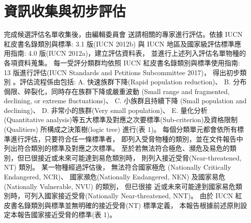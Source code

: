 \section{資訊收集與初步評估}
\begin{multicols}{2}
完成候選評估名單收集後，由編輯委員會
送請相關的專家進行評估。依據 IUCN 紅皮書名錄類別與標準: 3.1 版(IUCN 2012b) 與
IUCN 地區及國家級評估標準應用指南: 4.0 版(IUCN 2012a)，建立評估資料表，
並進行上述列入評估名單物種的各項資料蒐集。
每一受評分類群均依照 IUCN 紅皮書名錄類別與標準使用指南:
13 版進行評估(IUCN Standards and Petitions Subcommittee 2017)，
得出初步類別 。評估流程係由包括: A. 快速族群下降(Rapid population reduction)、
B. 分布侷限、碎裂化，同時存在族群下降或嚴重波動 (Small range and fragmented, declining, or extreme fluctuations)、
C. 小族群且持續下降 (Small population and declining)、
D. 非常小的族群(Very small population)、
E. 量化分析 (Quantitative analysis)等五大標準及對應之次要標準(Sub-criterion)及資格限制(Qualitiers)
所構成之決策樹(logic tree) 進行(表 1)。
每個分類單元都會依所有標準進行評估，只要符合任一條標準者，
即列入受脅物種的類別，並在文件報告中列出符合類別的標準及對應之次標準。
至於若無法符合極危、瀕危及易危的類別，但已很接近或未來可能達到易危類別時，
則列入接近受脅(Near-threatened, NT) 類別。 某一物種經過評估後，
無法符合國家極危 (Nationally Critically Endangered, NCR)、
國家瀕危(Nationally Endangered, NEN) 及國家易危 (Nationally Vulnerable, NVU) 的類別，
但已很接 近或未來可能達到國家易危類別時，可列入國家接近受脅(Nationally Near-threatened, NNT)。
由於 IUCN 紅皮書名錄類別與標準並無明確的接近受脅(NT) 標準定義，
本報告根據前述原則設定本報告國家接近受脅的標準(表 1)。\\
\end{multicols}
